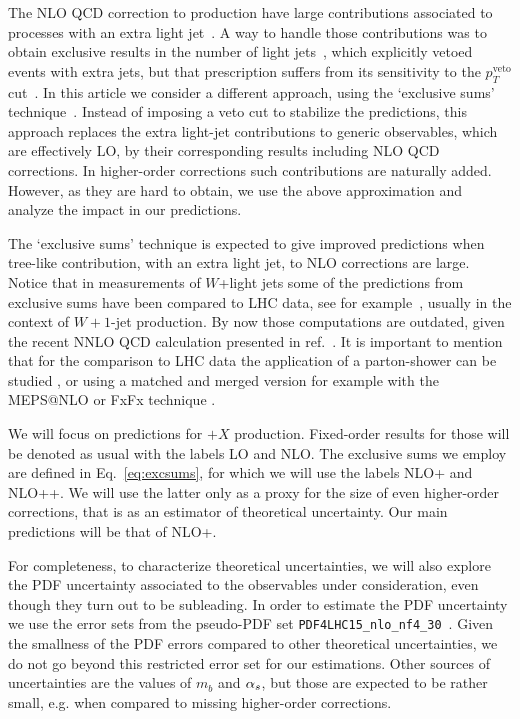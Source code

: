 The NLO QCD correction to \Wbb{} production have large contributions associated to
processes with an extra light jet~\cite{Ellis:1998fv,FebresCordero:2006sj,Cordero:2009kv}.
 A way to handle those
contributions was to obtain exclusive results in the number of light
jets~\cite{FebresCordero:2006sj}, which explicitly vetoed
events with extra jets, but that prescription suffers from its sensitivity
to the $p_T^\mathrm{veto}$ cut~\cite{Tackmann:2012bt}. 
In this article we consider a different approach, using the `exclusive sums'
technique~\cite{ESums}.
Instead of imposing a veto cut to stabilize the predictions, this approach
replaces the extra light-jet contributions to generic observables,
which are effectively LO, by their corresponding results including NLO QCD
corrections. In higher-order corrections such contributions are naturally
added. However, as they are hard to obtain, we use the above
approximation and analyze the impact in our predictions.


The `exclusive sums' technique is expected to give improved predictions when
tree-like contribution, with an extra light jet, to NLO corrections are 
large. Notice that in measurements of $W$+light jets some of the predictions
from exclusive sums have been compared to LHC data, see for
example~\cite{Aad:2014qxa,ATLAS:ratio2017}, usually in the context of $W+1$-jet production. By
now those computations are outdated, given the recent NNLO QCD calculation
presented in ref.~\cite{Boughezal:2015dva}. It is important to mention that for the comparison to LHC data the
application of a parton-shower can be studied \cite{Luisoni:2015mpa}, or using a
matched and merged version for example with the MEPS@NLO \cite{Hoeche:2012yf} or FxFx technique \cite{Frederix:2012ps}.


We will focus on predictions for \Wbb$+X$ production. Fixed-order
results for those will be denoted as usual with the labels LO and NLO. The
exclusive sums we employ are defined in Eq.~\eqref{eq:excsums}, for which we
will use the labels NLO+ and NLO++.
We will use the latter only as a proxy for the size of even
higher-order corrections, that is as an estimator of theoretical uncertainty.
Our main predictions will be that of NLO+.

For completeness, to characterize theoretical uncertainties, we will also explore the PDF uncertainty associated to the
observables under consideration, even though 
they turn out to be subleading. In order to estimate the PDF uncertainty we use
the error sets from the pseudo-PDF set
\texttt{PDF4LHC15\_nlo\_nf4\_30}~\cite{Butterworth:2015oua}. 
Given the smallness of the PDF errors compared to
other theoretical uncertainties, we do not go beyond this
restricted error set for our estimations. Other sources of
uncertainties are the values of $m_b$ and $\alpha_s$, but those are expected to
be rather small, e.g. when compared to missing higher-order corrections.

